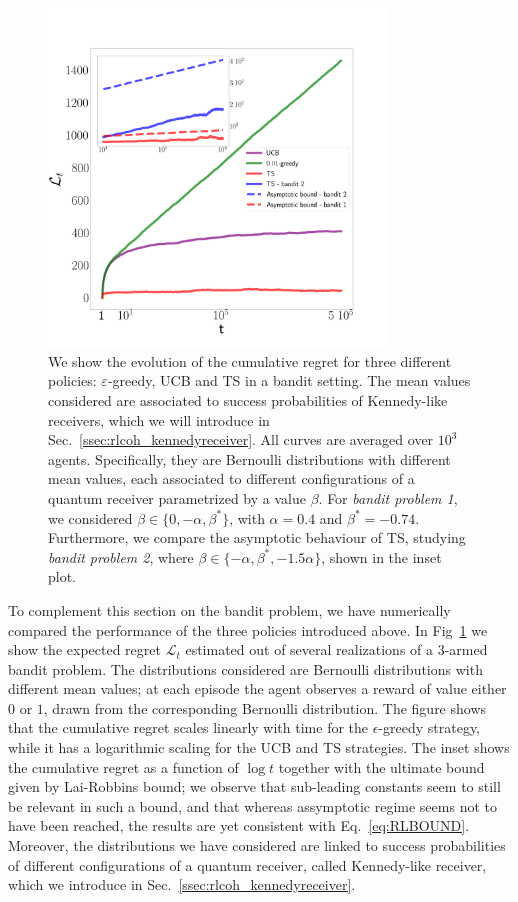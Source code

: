\begin{figure}[t!]
    \centering
    \includegraphics[width=0.8\textwidth]{Figures/1bandit/bandit_numerics_not_shifted.png}
    \caption{We show the evolution of the cumulative regret for three different policies: $\varepsilon$-greedy, UCB and TS in a bandit setting. The mean values considered are associated to success probabilities of Kennedy-like receivers, which we will introduce in Sec.~\ref{ssec:rlcoh_kennedyreceiver}.  All curves are averaged  over $10^{3}$ agents. Specifically, they are Bernoulli distributions with different mean values, each associated to different configurations of a quantum receiver parametrized by a value $\beta$. For \textit{bandit problem 1}, we considered $\beta \in \{0, -\alpha, \beta^{*}\}$, with $\alpha = 0.4$ and $\beta^{*} = -0.74$.
    Furthermore, we compare the asymptotic behaviour of TS, studying \textit{bandit problem 2}, where $\beta \in \{-\alpha, \beta^{*}, -1.5 \alpha\}$, shown in the inset plot.}
    \label{fig:bandfig}
\end{figure}

To complement this section on the bandit problem, we have numerically compared the performance of the three policies introduced above. In Fig~\ref{fig:bandfig} we show the expected regret $\mathcal{L}_t$ estimated out of several realizations of a 3-armed bandit problem. The distributions considered are Bernoulli distributions with different mean values; at each episode the agent observes a reward of value either $0$ or $1$, drawn from the corresponding Bernoulli distribution. The figure shows that the cumulative regret scales linearly with time for the $\epsilon$-greedy strategy, while it has a logarithmic scaling for the UCB and TS strategies. The inset shows the cumulative regret as a function of $\log t$ together with the ultimate bound given by Lai-Robbins bound; we observe that sub-leading constants seem to still be relevant in such a bound, and that whereas assymptotic regime seems not to have been reached, the results are yet consistent with Eq.~\ref{eq:RLBOUND}. Moreover, the distributions we have considered are linked to success probabilities of different configurations of a quantum receiver,
called Kennedy-like receiver, which we introduce in Sec.~\ref{ssec:rlcoh_kennedyreceiver}.

